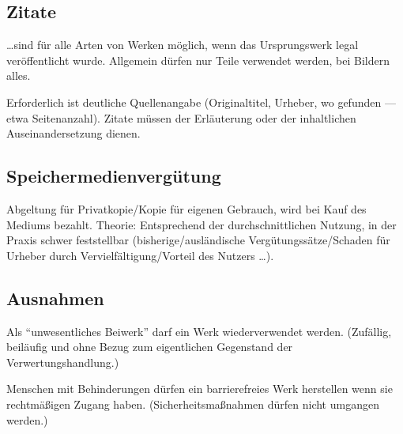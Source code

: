 \documentclass[twocolumn]{article}
\begin{document}
\subsection{Zitate}

\ldots sind für alle Arten von Werken möglich, wenn das Ursprungswerk legal veröffentlicht wurde. Allgemein dürfen nur Teile verwendet werden, bei Bildern alles.

Erforderlich ist deutliche Quellenangabe (Originaltitel, Urheber, wo gefunden --- etwa Seitenanzahl). Zitate müssen der Erläuterung oder der inhaltlichen Auseinandersetzung dienen.

\subsection{Speichermedienvergütung}

Abgeltung für Privatkopie/Kopie für eigenen Gebrauch, wird bei Kauf des Mediums bezahlt. Theorie: Entsprechend der durchschnittlichen Nutzung, in der Praxis schwer feststellbar (bisherige/ausländische Vergütungssätze/Schaden für Urheber durch Vervielfältigung/Vorteil des Nutzers \ldots).

\subsection{Ausnahmen}

Als \enquote{unwesentliches Beiwerk} darf ein Werk wiederverwendet werden. (Zufällig, beiläufig und ohne Bezug zum eigentlichen Gegenstand der Verwertungshandlung.)

Menschen mit Behinderungen dürfen ein barrierefreies Werk herstellen wenn sie rechtmäßigen Zugang haben. (Sicherheitsmaßnahmen dürfen nicht umgangen werden.)
\end{document}
